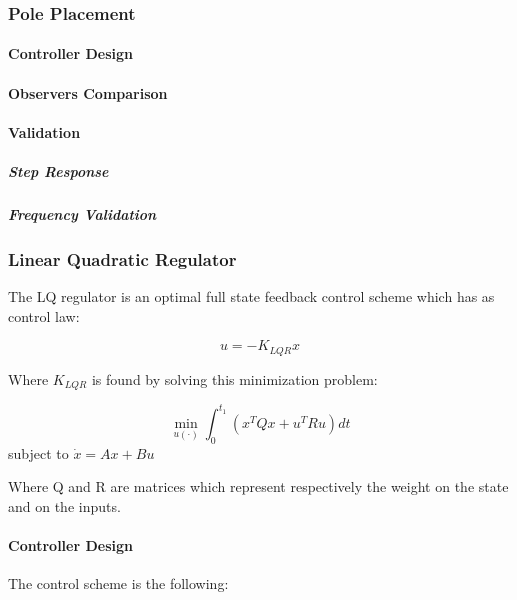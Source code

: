             \subsubsection{Pole Placement}

                \paragraph{Controller Design}

                \paragraph{Observers Comparison}

                \paragraph{Validation}

                    \subparagraph{Step Response}

                    \subparagraph{Frequency Validation}


            \subsubsection{Linear Quadratic Regulator}

                The LQ regulator is an optimal full state feedback control scheme which has as control law:

                \begin{equation*}
                    u = -K_{LQR}x
                \end{equation*}

                Where $K_{LQR}$ is found by solving this minimization problem:


                $$ \min _{u(\cdot)} \int_0^{t_1}\left(x^T Q x+u^T R u\right) d t $$ 
                subject to $\dot{x}=A x+B u$ 

                Where Q and R are matrices which represent respectively the weight on the state and on the inputs.

                \paragraph{Controller Design}

                    The control scheme is the following:


